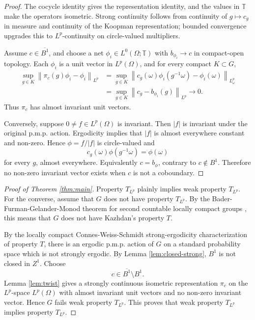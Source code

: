 \documentclass[11pt]{article}
\theoremstyle{definition}
\newcommand{\T}{\mathbb T}
\newcommand{\norm}[1]{\left\lVert #1\right\rVert}
\begin{document}
\begin{proof}
The cocycle identity gives the representation identity, and the values in
\(\T\) make the operators isometric.  Strong continuity follows from
continuity of \(g\mapsto c_g\) in measure and continuity of the Koopman
representation; bounded convergence upgrades this to \(L^p\)-continuity on
circle-valued multipliers.

Assume \(c\in\overline{B^1}\), and choose a net \(\phi_i\in L^0(\Omega;\T)\)
with \(b_{\phi_i}\to c\) in compact-open topology.  Each \(\phi_i\) is a unit
vector in \(L^p(\Omega)\), and for every compact \(K\subset G\),
\[
\begin{aligned}
   \sup_{g\in K}\norm{\pi_c(g)\phi_i-\phi_i}_{L^p}
   &=\sup_{g\in K}\norm{
       c_g(\omega)\phi_i(g^{-1}\omega)-\phi_i(\omega)}_{L^p_\omega} \\
   &=\sup_{g\in K}\norm{c_g-b_{\phi_i}(g)}_{L^p}\to0.
\end{aligned}
\]
Thus \(\pi_c\) has almost invariant unit vectors.

Conversely, suppose \(0\ne f\in L^p(\Omega)\) is invariant.  Then
\(|f|\) is invariant under the original p.m.p. action.  Ergodicity implies
that \(|f|\) is almost everywhere constant and non-zero.  Hence
\(\phi=f/|f|\) is circle-valued and
\[
   c_g(\omega)\phi(g^{-1}\omega)=\phi(\omega)
\]
for every \(g\), almost everywhere.  Equivalently \(c=b_\phi\), contrary to
\(c\notin B^1\).  Therefore no non-zero invariant vector exists when \(c\) is
not a coboundary.
\end{proof}

\begin{proof}[Proof of Theorem \ref{thm:main}]
Property \(T_{L^p}\) plainly implies weak property \(T_{L^p}\).  For the
converse, assume that \(G\) does not have property \(T_{L^p}\).  By the
Bader-Furman-Gelander-Monod theorem for second countable locally compact
groups \cite{BaderFurmanGelanderMonod}, this means that \(G\) does not have
Kazhdan's property \(T\).

By the locally compact Connes-Weiss-Schmidt strong-ergodicity
characterization of property \(T\), there is an ergodic p.m.p. action of
\(G\) on a standard probability space which is not strongly ergodic.  By
Lemma \ref{lem:closed-strong}, \(B^1\) is not closed in \(Z^1\).  Choose
\[
   c\in \overline{B^1}\setminus B^1 .
\]
Lemma \ref{lem:twist} gives a strongly continuous isometric representation
\(\pi_c\) on the \(L^p\)-space \(L^p(\Omega)\) with almost invariant unit
vectors and no non-zero invariant vector.  Hence \(G\) fails weak property
\(T_{L^p}\).  This proves that weak property \(T_{L^p}\) implies property
\(T_{L^p}\).
\end{proof}
\end{document}
